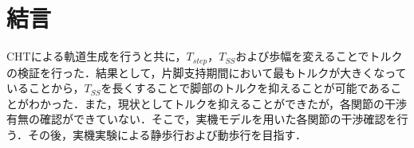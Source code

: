 \documentclass[twocolumn]{jsarticle}
\begin{document}
\section{結言}
CHTによる軌道生成を行うと共に，$T_{step}$，$T_{SS}$および歩幅を変えることでトルクの検証を行った．結果として，片脚支持期間において最もトルクが大きくなっていることから，$T_{SS}$を長くすることで脚部のトルクを抑えることが可能であることがわかった．また，現状としてトルクを抑えることができたが，各関節の干渉有無の確認ができていない．そこで，実機モデルを用いた各関節の干渉確認を行う．その後，実機実験による静歩行および動歩行を目指す．




\end{document}

